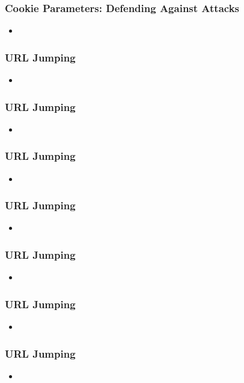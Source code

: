 \begin{frame}
    \frametitle{Cookie Parameters: Defending Against Attacks}
    \begin{itemize}
        \item 
    \end{itemize}
\end{frame}


\begin{frame}
    \frametitle{URL Jumping}
    \begin{itemize}
        \item 
    \end{itemize}
\end{frame}

\begin{frame}
    \frametitle{URL Jumping}
    \begin{itemize}
        \item 
    \end{itemize}
\end{frame}

\begin{frame}
    \frametitle{URL Jumping}
    \begin{itemize}
        \item 
    \end{itemize}
\end{frame}

\begin{frame}
    \frametitle{URL Jumping}
    \begin{itemize}
        \item 
    \end{itemize}
\end{frame}

\begin{frame}
    \frametitle{URL Jumping}
    \begin{itemize}
        \item 
    \end{itemize}
\end{frame}

\begin{frame}
    \frametitle{URL Jumping}
    \begin{itemize}
        \item 
    \end{itemize}
\end{frame}

\begin{frame}
    \frametitle{URL Jumping}
    \begin{itemize}
        \item 
    \end{itemize}
\end{frame}